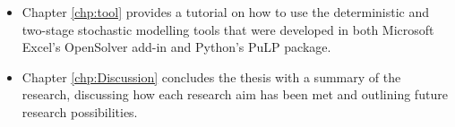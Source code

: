 \documentclass[../thesis.tex]{subfiles}
\begin{document}
\begin{itemize}
    \item Chapter \ref{chp:tool} provides a tutorial on how to use the deterministic and two-stage stochastic modelling tools that were developed in both Microsoft Excel's OpenSolver add-in and Python's PuLP package.
    
    \item Chapter \ref{chp:Discussion} concludes the thesis with a summary of the research, discussing how each research aim has been met and outlining future research possibilities. 
    
\end{itemize}
\end{document}
